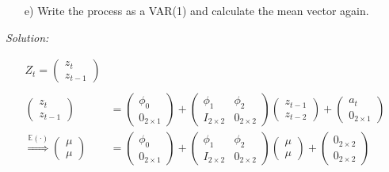\documentclass[12pt,a4paper]{article}
\begin{document}
\begin{itemize}
    \item[e)] Write the process as a VAR(1) and calculate the mean vector again.
\end{itemize}

\emph{Solution:}

\begin{align*}
  Z_t = \begin{pmatrix}  z_{t} \\ z_{t-1} \end{pmatrix}\\
  \\
  \begin{pmatrix} z_t  \\ z_{t-1} \end{pmatrix} & = \begin{pmatrix} \phi_0  \\ 0_{2 \times 1 }\end{pmatrix} + \begin{pmatrix} \phi_1 & \phi_2  \\ I_{2 \times 2}  & 0_{2 \times 2} \end{pmatrix} \begin{pmatrix} z_{t-1}  \\ z_{t-2} \end{pmatrix} + \begin{pmatrix} a_t  \\ 0_{2 \times 1} \end{pmatrix} \\
  \overset{\mathbb{E} (\cdot)}{\Rightarrow} \begin{pmatrix} \mu  \\ \mu \end{pmatrix} & =\begin{pmatrix} \phi_0  \\ 0_{2 \times 1} \end{pmatrix} + \begin{pmatrix} \phi_1 & \phi_2 \\ I_{2 \times 2} & 0_{2 \times 2} \end{pmatrix} \begin{pmatrix} \mu  \\ \mu \end{pmatrix} + \begin{pmatrix} 0_{2 \times 2} \\ 0_{2 \times 2} \end{pmatrix}\\

\end{align*}
\end{document}
